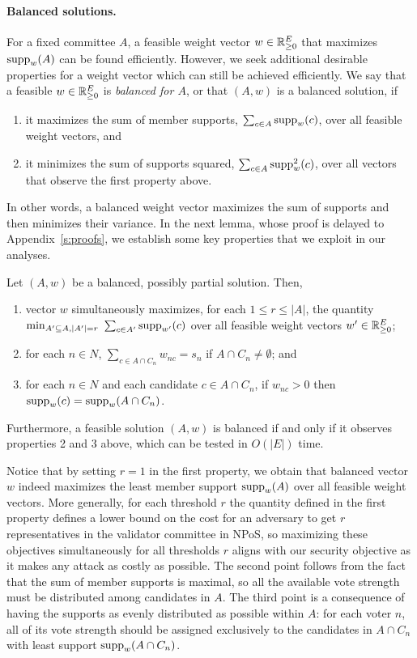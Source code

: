 \paragraph{Balanced solutions.}
For a fixed committee $A$, a feasible weight vector $w\in\mathbb{R}_{\geq 0}^E$ that maximizes $\operatorname{supp}_w(A)$ can be found efficiently. 
However, we seek additional desirable properties for a weight vector which can still be achieved efficiently. We say that a feasible $w\in\mathbb{R}_{\geq 0}^E$ is \emph{balanced for $A$}, or that $(A,w)$ is a balanced solution, if
\begin{enumerate}
    \item it maximizes the sum of member supports, $\sum_{c\in A} \operatorname{supp}_w(c)$, over all feasible weight vectors, and 
    \item it minimizes the sum of supports squared, $\sum_{c\in A} \operatorname{supp}_w^2(c)$, over all vectors that observe the first property above. 
\end{enumerate}
%
In other words, a balanced weight vector maximizes the sum of supports and then minimizes their variance. 
In the next lemma, whose proof is delayed to Appendix~\ref{s:proofs}, we establish some key properties that we exploit in our analyses. 

\begin{lemma}\label{lem:balanced}
Let $(A,w)$ be a balanced, possibly partial solution. Then,
\begin{enumerate}
    \item vector $w$ simultaneously maximizes, for each $1\leq r \leq |A|$, the quantity $\min_{A'\subseteq A, |A'|=r} \ \sum_{c\in A'} \supp_{w'}(c)$ over all feasible weight vectors $w'\in\mathbb{R}_{\geq 0}^E$; 
		\item for each $n\in N$, $\sum_{c\in A\cap C_n} w_{nc}=s_n$ if $A\cap C_n\neq \emptyset$; and
    \item for each $n\in N$ and each candidate $c\in A\cap C_n$, if $w_{nc} > 0$ then $\operatorname{supp}_w(c)=\operatorname{supp}_w(A\cap C_n)$. 
\end{enumerate}
Furthermore, a feasible solution $(A,w)$ is balanced if and only if it observes properties 2 and 3 above, which can be tested in $O(|E|)$ time.
\end{lemma}

Notice that by setting $r=1$ in the first property, we obtain that balanced vector $w$ indeed maximizes the least member support $\operatorname{supp}_w(A)$ over all feasible weight vectors. 
More generally, for each threshold $r$ the quantity defined in the first property defines a lower bound on the cost for an adversary to get $r$ representatives in the validator committee in NPoS, so maximizing these objectives simultaneously for all thresholds $r$ aligns with our security objective as it makes any attack as costly as possible. 
The second point follows from the fact that the sum of member supports is maximal, so all the available vote strength must be distributed among candidates in $A$. 
The third point is a consequence of having the supports as evenly distributed as possible within $A$: for each voter $n$, all of its vote strength should be assigned exclusively to the candidates in $A\cap C_n$ with least support $\operatorname{supp}_w(A\cap C_n)$. 

